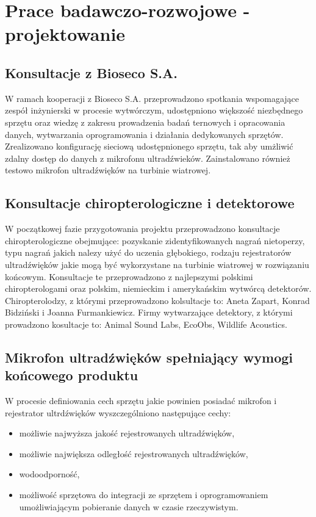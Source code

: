 \documentclass{sprz}
\begin{document}
\chapter{Prace badawczo-rozwojowe - projektowanie}

\section{Konsultacje z Bioseco S.A.}
W ramach kooperacji z Bioseco S.A. przeprowadzono spotkania wspomagające zespół inżynierski w procesie wytwórczym, udostępniono większość niezbędnego sprzętu oraz wiedzę z zakresu prowadzenia badań ternowych i opracowania danych, wytwarzania oprogramowania i działania dedykowanych sprzętów. Zrealizowano konfigurację sieciową udostępnionego sprzętu, tak aby umżliwić zdalny dostęp do danych z mikrofonu ultradźwieków. Zainstalowano również testowo mikrofon ultradźwięków na turbinie wiatrowej.

\section{Konsultacje chiropterologiczne i detektorowe}
W początkowej fazie przygotowania projektu przeprowadzono konsultacje chiropterologiczne obejmujące: pozyskanie zidentyfikowanych nagrań nietoperzy, typu nagrań jakich nalezy użyć do uczenia głębokiego, rodzaju rejestratorów ultradźwięków jakie mogą być wykorzystane na turbinie wiatrowej w rozwiązaniu końcowym. Konsultacje te przeprowadzono z najlepszymi polskimi chiropterologami oraz polskim, niemieckim i amerykańskim wytwórcą detektorów. Chiropterolodzy, z którymi przeprowadzono kolsultacje to: Aneta Zapart, Konrad Bidziński i Joanna Furmankiewicz. Firmy wytwarzające detektory, z którymi prowadzono kosultacje to: Animal Sound Labs, EcoObs, Wildlife Acoustics.

\section{Mikrofon ultradźwięków spełniający wymogi końcowego produktu}
W procesie definiowania cech sprzętu jakie powinien posiadać mikrofon i rejestrator ultrdźwięków wyszczególniono następujące cechy:
  \begin{itemize}
    \item{możliwie najwyższa jakość rejestrowanych ultradźwięków,}
    \item{możliwie największa odległość rejestrowanych ultradźwięków,}
    \item{wodoodporność,}
    \item{możliwość sprzętowa do integracji ze sprzętem i oprogramowaniem umożliwiającym pobieranie danych w czasie rzeczywistym.}
  \end{itemize}
\end{document}
